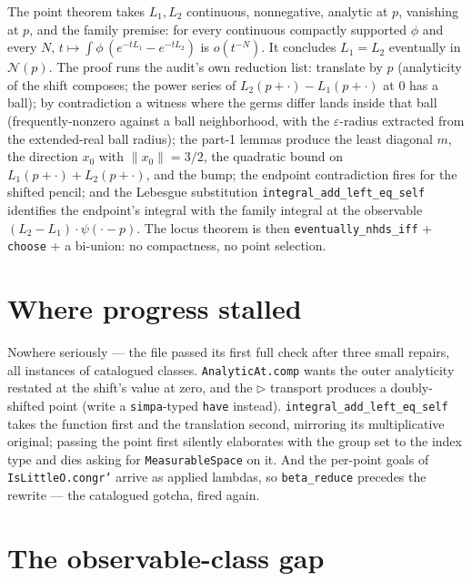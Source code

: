\documentclass[11pt]{article}
\newcommand{\code}[1]{\texttt{#1}}
\begin{document}
\begin{sloppypar}
The point theorem takes $L_1, L_2$ continuous, nonnegative, analytic
at $p$, vanishing at $p$, and the family premise: for every
continuous compactly supported $\phi$ and every $N$,
$t \mapsto \int \phi\,(e^{-tL_1} - e^{-tL_2})$ is $o(t^{-N})$. It
concludes $L_1 = L_2$ eventually in $\mathcal{N}(p)$. The proof runs
the audit's own reduction list: translate by $p$ (analyticity of the
shift composes; the power series of $L_2(p+\cdot) - L_1(p+\cdot)$ at
$0$ has a ball); by contradiction a witness where the germs differ
lands inside that ball (frequently-nonzero against a ball
neighborhood, with the $\varepsilon$-radius extracted from the
extended-real ball radius); the part-1 lemmas produce the least
diagonal $m$, the direction $x_0$ with $\|x_0\| = 3/2$, the quadratic
bound on $L_1(p+\cdot) + L_2(p+\cdot)$, and the bump; the endpoint
contradiction fires for the shifted pencil; and the Lebesgue
substitution \code{integral\_add\_left\_eq\_self} identifies the
endpoint's integral with the family integral at the observable
$(L_2 - L_1)\cdot\psi(\cdot - p)$. The locus theorem is then
\code{eventually\_nhds\_iff} + \code{choose} + a bi-union: no
compactness, no point selection.
\end{sloppypar}

\section{Where progress stalled}

Nowhere seriously --- the file passed its first full check after
three small repairs, all instances of catalogued classes.
\code{AnalyticAt.comp} wants the outer analyticity restated at the
shift's value at zero, and the \code{\(\triangleright\)} transport
produces a doubly-shifted point (write a \code{simpa}-typed
\code{have} instead). \code{integral\_add\_left\_eq\_self} takes the
function first and the translation second, mirroring its
multiplicative original; passing the point first silently elaborates
with the group set to the index type and dies asking for
\code{MeasurableSpace} on it. And the per-point goals of
\code{IsLittleO.congr'} arrive as applied lambdas, so
\code{beta\_reduce} precedes the rewrite --- the catalogued gotcha,
fired again.

\section{The observable-class gap}
\end{document}

